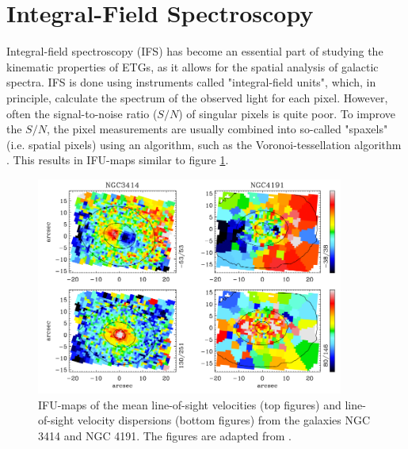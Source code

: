 \documentclass[english, twoside]{HYgradu}
\begin{document}
\section{Integral-Field Spectroscopy} \label{section:IFU}

Integral-field spectroscopy (IFS) has become an essential part of studying the kinematic properties of ETGs, as it allows for the spatial analysis of galactic spectra. IFS is done using instruments called "integral-field units", which, in principle, calculate the spectrum of the observed light for each pixel. However, often the signal-to-noise ratio ($S/N$) of singular pixels is quite poor. To improve the $S/N$, the pixel measurements are usually combined into so-called "spaxels" (i.e. spatial pixels) using an algorithm, such as the Voronoi-tessellation algorithm \citep{Cappellari2003}. This results in IFU-maps similar to figure \ref{figure:krajnovic_ifus}.

\begin{figure}
	\centering
	\includegraphics[width=0.9\textwidth]{krajnovic_ifus.png}
	\caption{IFU-maps of the mean line-of-sight velocities (top figures) and line-of-sight velocity dispersions (bottom figures) from the galaxies NGC 3414 and NGC 4191. The figures are adapted from \cite{Krajnovic2011}.}
	\label{figure:krajnovic_ifus}
\end{figure}
\end{document}
